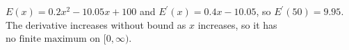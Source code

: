 $E(x)=\boxed{0.2x^2-10.05x+100}$ and $E^\prime(x)=0.4x-10.05$, so $\boxed{E^\prime(50)=9.95}$. The derivative increases without bound as $x$ increases, so it has $\boxed{\text{no finite maximum}}$ on $[0,\infty)$.

